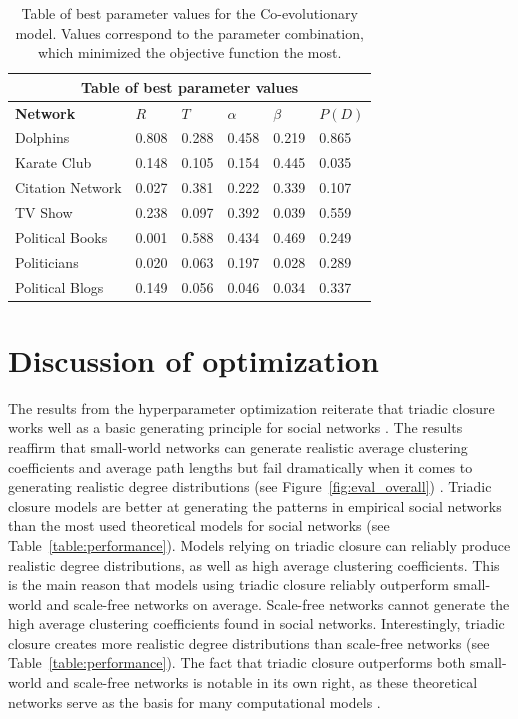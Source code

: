 \documentclass[11pt]{article}
\begin{document}
\begin{table}[H]
\begin{center}
    
\begin{tabular}{ |p{3cm}||p{2cm}|p{2cm}|p{2cm}|p{2cm}|p{2cm}|}
    \hline
    \multicolumn{6}{|c|}{Table of best parameter values} \\
    \hline
    \bf{Network} & $R$ & $T$ & $\alpha$ & $\beta$ & $P(D)$\\
    \hline
    Dolphins   & 0.808    &0.288&   0.458&   0.219&   0.865\\
    Karate Club&   0.148  & 0.105   &0.154	&   0.445	&   0.035	\\
    Citation Network   &0.027 & 0.381&  0.222&   0.339&   0.107\\
    TV Show & 0.238 & 0.097 & 0.392 & 0.039 & 0.559 \\
    Political Books &0.001 & 0.588&  0.434&   0.469&   0.249\\
    Politicians&   0.020  & 0.063 &0.197&   0.028&   0.289\\
    Political Blogs & 0.149  & 0.056  &0.046&   0.034&   0.337\\
    \hline
\end{tabular}
\end{center}
\caption{Table of best parameter values for the Co-evolutionary model. Values correspond to the parameter combination, which minimized the objective function the most.}
\label{table:best_params}
\end{table}

\section{Discussion of optimization}
The results from the hyperparameter optimization reiterate that triadic closure works well as a basic generating principle for social networks \cite{jacksonmeeting2007,kossinets_origins_2009,bianconi_triadic_2014}. 
The results reaffirm that small-world networks can generate realistic average clustering coefficients and average path lengths but fail dramatically when it comes to generating realistic degree distributions (see Figure~\ref{fig:eval_overall}) \cite{jacksonmeeting2007}. Triadic closure models are better at generating the patterns in empirical social networks than the most used theoretical models for social networks (see Table~\ref{table:performance}). Models relying on triadic closure can reliably produce realistic degree distributions, as well as high average clustering coefficients. This is the main reason that models using triadic closure reliably outperform small-world and scale-free networks on average. Scale-free networks cannot generate the high average clustering coefficients found in social networks. Interestingly, triadic closure creates more realistic degree distributions than scale-free networks (see Table~\ref{table:performance}). The fact that triadic closure outperforms both small-world and scale-free networks is notable in its own right, as these theoretical networks serve as the basis for many computational models \cite{flache_models_2017, turner_paths_2018}. 
\end{document}
